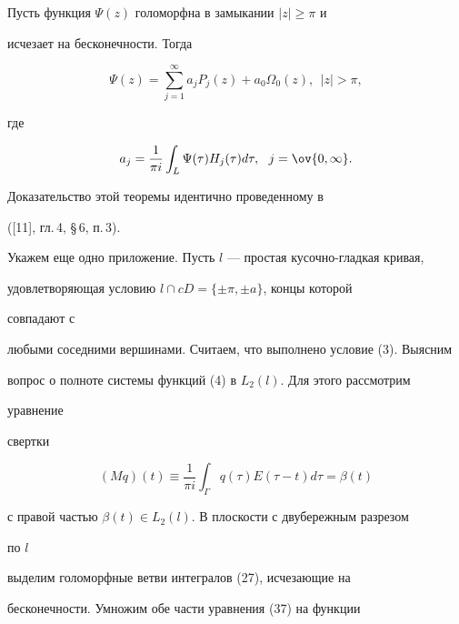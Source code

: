  


\begin{thm} 


Пусть функция $\Psi(z)$ голоморфна в замыкании $|z|\ge\pi$ и  


исчезает на бесконечности. Тогда 


$$ 


\Psi(z)=\sum^\infty_{j=1} a_j P_j(z)+ 


a_0\Omega_0(z),\ \ |z|>\pi, 


$$ 


где 


$$ 


a_j=\frac{1}{\pi i}\int_L \Psi(\tau)H_j(\tau)d\tau, 


\ \ j=\ov{0,\infty}. 


$$ 


\end{thm} 


 


Доказательство этой теоремы идентично проведенному в 


([11], гл.\,4, \S\,6, п.\,3).  


 


Укажем еще одно приложение. Пусть $l$ --- простая кусочно-гладкая кривая, 


удовлетворяющая условию $l\cap c D=\{\pm\pi,\pm a\}$, концы которой 


совпадают с  


любыми соседними вершинами. Считаем, что выполнено условие (3). Выясним 


вопрос о полноте системы функций (4) в $L_2(l)$. Для этого рассмотрим 


уравнение  


свертки 


\begin{equation} 


(M q)(t)\equiv\frac{1}{\pi i}\int_\Gamma q(\tau) 


E(\tau-t)d\tau=\beta(t) 


\end{equation} 


с правой частью $\beta(t)\in L_2(l)$. В плоскости с двубережным разрезом 


по $l$ 


выделим голоморфные ветви интегралов (27), исчезающие на 


бесконечности. Умножим обе части уравнения (37) на функции  



